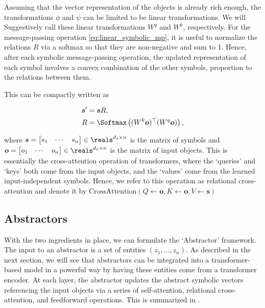 Assuming that the vector representation of the objects is already rich enough, the transformations $\phi$ and $\psi$ can be limited to be linear transformations. We will Suggestively call these linear transformations $W^q$ and $W^k$, respectively. For the message-passing operation \cref{eq:linear_symbolic_mp}, it is useful to normalize the relations $R$ via a softmax so that they are non-negative and sum to 1. Hence, after each symbolic message-passing operation, the updated representation of each symbol involves a convex combination of the other symbols, proportion to the relations between them.

This can be compactly written as

\begin{equation}
    \label{eq:relational_crossattention}
    \begin{split}
        \boldsymbol{s}' &= \boldsymbol{s} R, \\
        R &= \Softmax\left((W^k \boldsymbol{o})^\top (W^q \boldsymbol{o})\right),
    \end{split}
\end{equation}

\noindent where $\boldsymbol{s} = \begin{bmatrix}s_1 & \cdots & s_n \end{bmatrix} \in \reals^{d_s \times n}$ is the matrix of symbols and $\boldsymbol{o} = \begin{bmatrix}o_1 & \cdots & o_n \end{bmatrix} \in \reals^{d_o \times n}$ is the matrix of input objects. This is essentially the cross-attention operation of transformers, where the `queries' and `keys' both come from the input objects, and the `values' come from the learned input-independent symbols. Hence, we refer to this operation as relational cross-attention and denote it by $\text{CrossAttention}(Q \gets \boldsymbol{o}, K \gets \boldsymbol{o}, V \gets \boldsymbol{s})$

\subsection{Abstractors}

With the two ingredients in place, we can formulate the `Abstractor' framework. The input to an abstractor is a set of entities $(z_1, ..., z_n)$. As described in the next section, we will see that abstractors can be integrated into a transformer-based model in a powerful way by having these entities come from a transformer encoder. At each layer, the abstractor updates the abstract symbolic vectors referencing the input objects via a series of self-attention, relational cross-attention, and feedforward operations. This is summarized in .

